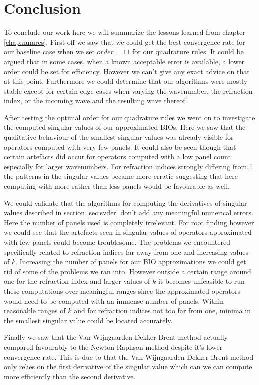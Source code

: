 \documentclass[a4paper, oneside]{thirdparty_stylesheets/discothesis}
\begin{document}
\chapter{Conclusion}
To conclude our work here we will summarize the lessons learned from chapter \ref{chap:numres}.
First off we saw that we could get the best convergence rate for our baseline case when we set $order=11$ for our quadrature rules.
It could be argued that in some cases, when a known acceptable error is available, a lower order could be set for efficiency.
However we can't give any exact advice on that at this point.
Furthermore we could determine that our algorithms were mostly stable except for certain edge cases when varying the wavenumber, the refraction index, or the incoming wave and the resulting wave thereof.

After testing the optimal order for our quadrature rules we went on to investigate the computed singular values of our approximated BIOs.
Here we saw that the qualitative behaviour of the smallest singular values was already visible for operators computed with very few panels.
It could also be seen though that certain artefacts did occur for operators computed with a low panel count especially for larger wavenumbers.
For refraction indices strongly differing from 1 the patterns in the singular values became more erratic suggesting that here computing with more rather than less panels would be favourable as well.

We could validate that the algorithms for computing the derivatives of singular values described in section \ref{sec:svder} don't add any meaningful numerical errors.
Here the number of panels used is completely irrelevant.
For root finding however we could see that the artefacts seen in singular values of operators approximated with few panels could become troublesome.
The problems we encountered specifically related to refraction indices far away from one and increasing values of $k$.
Increasing the number of panels for our BIO approximations we could get rid of some of the problems we ran into.
However outside a certain range around one for the refraction index and larger values of $k$ it becomes unfeasible to run these computations over meaningful ranges since the approximated operators would need to be computed with an immense number of panels.
Within reasonable ranges of $k$ and for refraction indices not too far from one, minima in the smallest singular value could be located accurately.

Finally we saw that the Van Wijngaarden-Dekker-Brent method actually compared favourably to the Newton-Raphson method despite it's lower convergence rate.
This is due to that the Van Wijngaarden-Dekker-Brent method only relies on the first derivative of the singular value which can we can compute more efficiently than the second derivative.
\end{document}
